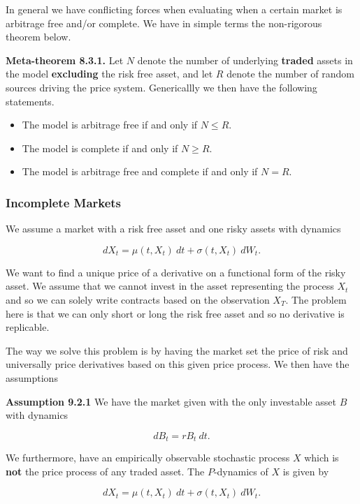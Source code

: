 \documentclass[
]{article}
\providecommand{\tightlist}{%
  \setlength{\itemsep}{0pt}\setlength{\parskip}{0pt}}
\begin{document}
In general we have conflicting forces when evaluating when a certain
market is arbitrage free and/or complete. We have in simple terms the
non-rigorous theorem below.

\textbf{Meta-theorem 8.3.1.} Let \(N\) denote the number of underlying
\textbf{traded} assets in the model \textbf{excluding} the risk free
asset, and let \(R\) denote the number of random sources driving the
price system. Genericallly we then have the following statements.

\begin{itemize}
\tightlist
\item
  The model is arbitrage free if and only if \(N\le R\).
\item
  The model is complete if and only if \(N\ge R\).
\item
  The model is arbitrage free and complete if and only if \(N=R\).
\end{itemize}

\hypertarget{incomplete-markets}{%
\subsubsection{Incomplete Markets}\label{incomplete-markets}}

We assume a market with a risk free asset and one risky assets with
dynamics

\[
dX_t=\mu(t,X_t)\ dt+\sigma(t,X_t)\ dW_t.
\]

We want to find a unique price of a derivative on a functional form of
the risky asset. We assume that we cannot invest in the asset
representing the process \(X_t\) and so we can solely write contracts
based on the observation \(X_T\). The problem here is that we can only
short or long the risk free asset and so no derivative is replicable.

The way we solve this problem is by having the market set the price of
risk and universally price derivatives based on this given price
process. We then have the assumptions

\textbf{Assumption 9.2.1} We have the market given with the only
investable asset \(B\) with dynamics

\[
dB_t=rB_t\ dt.
\]

We furthermore, have an empirically observable stochastic process \(X\)
which is \textbf{not} the price process of any traded asset. The
\(P\)-dynamics of \(X\) is given by

\[
dX_t=\mu(t,X_t)\ dt+\sigma(t,X_t)\ dW_t.
\]
\end{document}
